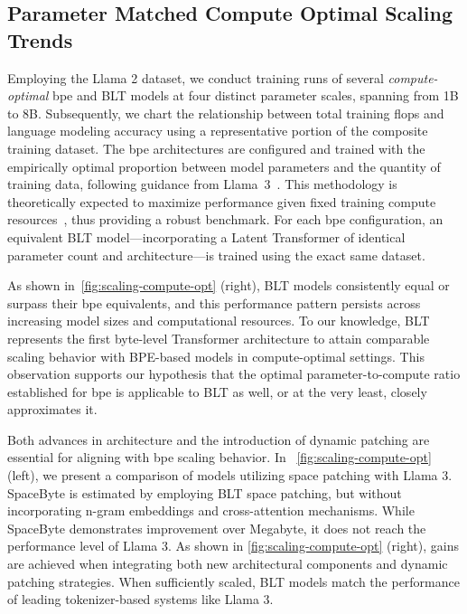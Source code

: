 \subsection{Parameter Matched Compute Optimal Scaling Trends}
\label{section:parameter-matched-scaling}
Employing the Llama 2 dataset, we conduct training runs of several \textit{compute-optimal} bpe and {\textsc BLT} models at four distinct parameter scales, spanning from 1B to 8B. Subsequently, we chart the relationship between total training flops and language modeling accuracy using a representative portion of the composite training dataset. The bpe architectures are configured and trained with the empirically optimal proportion between model parameters and the quantity of training data, following guidance from Llama~3~\citep{dubey2024llama}. This methodology is theoretically expected to maximize performance given fixed training compute resources~\citep{hoffmann2022training}, thus providing a robust benchmark. For each bpe configuration, an equivalent {\textsc BLT} model—incorporating a Latent Transformer of identical parameter count and architecture—is trained using the exact same dataset.

As shown in~\autoref{fig:scaling-compute-opt} (right), {\textsc BLT} models consistently equal or surpass their bpe equivalents, and this performance pattern persists across increasing model sizes and computational resources. To our knowledge, {\textsc BLT} represents the first byte-level Transformer architecture to attain comparable scaling behavior with BPE-based models in compute-optimal settings. This observation supports our hypothesis that the optimal parameter-to-compute ratio established for bpe is applicable to {\textsc BLT} as well, or at the very least, closely approximates it.

Both advances in architecture and the introduction of dynamic patching are essential for aligning with bpe scaling behavior. In ~\autoref{fig:scaling-compute-opt} (left), we present a comparison of models utilizing space patching with Llama 3. SpaceByte \citep{slagle2024spacebyte} is estimated by employing {\textsc BLT} space patching, but without incorporating n-gram embeddings and cross-attention mechanisms. While SpaceByte demonstrates improvement over Megabyte, it does not reach the performance level of Llama 3. As shown in \autoref{fig:scaling-compute-opt} (right), gains are achieved when integrating both new architectural components and dynamic patching strategies. When sufficiently scaled, {\textsc BLT} models match the performance of leading tokenizer-based systems like Llama 3.


